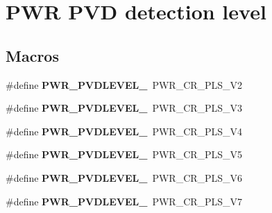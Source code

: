\hypertarget{group___p_w_r___p_v_d__detection__level}{}\section{P\+WR P\+VD detection level}
\label{group___p_w_r___p_v_d__detection__level}
\subsection*{Macros}
\begin{DoxyCompactItemize}
\item 
\mbox{\label{group___p_w_r___p_v_d__detection__level_gaddf4616a143ac3481f3043f2a4c21c18}} 
\#define {\bfseries P\+W\+R\+\_\+\+P\+V\+D\+L\+E\+V\+E\+L\+\_}~P\+W\+R\+\_\+\+C\+R\+\_\+\+P\+L\+S\+\_\+V2
\item 
\mbox{\label{group___p_w_r___p_v_d__detection__level_ga06e55b20a8777594f1a91ee71fac1f79}} 
\#define {\bfseries P\+W\+R\+\_\+\+P\+V\+D\+L\+E\+V\+E\+L\+\_}~P\+W\+R\+\_\+\+C\+R\+\_\+\+P\+L\+S\+\_\+V3
\item 
\mbox{\label{group___p_w_r___p_v_d__detection__level_gab26bb78650bbaef26ac9f9123c791cc7}} 
\#define {\bfseries P\+W\+R\+\_\+\+P\+V\+D\+L\+E\+V\+E\+L\+\_}~P\+W\+R\+\_\+\+C\+R\+\_\+\+P\+L\+S\+\_\+V4
\item 
\mbox{\label{group___p_w_r___p_v_d__detection__level_ga7b751743b3e29c237e6a0e1d7bdd0503}} 
\#define {\bfseries P\+W\+R\+\_\+\+P\+V\+D\+L\+E\+V\+E\+L\+\_}~P\+W\+R\+\_\+\+C\+R\+\_\+\+P\+L\+S\+\_\+V5
\item 
\mbox{\label{group___p_w_r___p_v_d__detection__level_ga03c0d3ae547deb1a51b8acafac101698}} 
\#define {\bfseries P\+W\+R\+\_\+\+P\+V\+D\+L\+E\+V\+E\+L\+\_}~P\+W\+R\+\_\+\+C\+R\+\_\+\+P\+L\+S\+\_\+V6
\item 
\mbox{\label{group___p_w_r___p_v_d__detection__level_ga46a1476440945c2b6426b4973172f24b}} 
\#define {\bfseries P\+W\+R\+\_\+\+P\+V\+D\+L\+E\+V\+E\+L\+\_}~P\+W\+R\+\_\+\+C\+R\+\_\+\+P\+L\+S\+\_\+V7

\end{DoxyCompactItemize}
